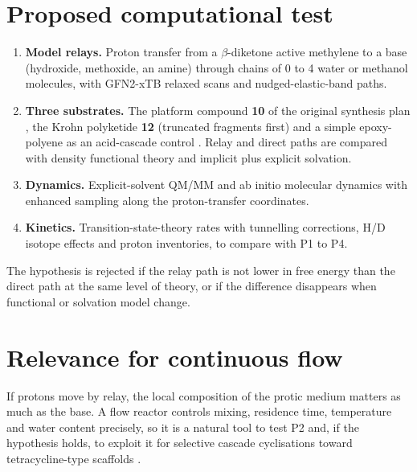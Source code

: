 \documentclass[11pt]{article}
\begin{document}
\section{Proposed computational test}\label{sec:valid}
\begin{enumerate}
\item \textbf{Model relays.} Proton transfer from a $\beta$-diketone active methylene to a base (hydroxide, methoxide, an amine) through chains of 0 to 4 water or methanol molecules, with GFN2-xTB \cite{bannwarth2019} relaxed scans and nudged-elastic-band paths.
\item \textbf{Three substrates.} The platform compound \textbf{10} of the original synthesis plan \cite{kleber2020}, the Krohn polyketide \textbf{12} \cite{krohn2000} (truncated fragments first) and a simple epoxy-polyene as an acid-cascade control \cite{corey1995,hess2017}. Relay and direct paths are compared with density functional theory and implicit plus explicit solvation.
\item \textbf{Dynamics.} Explicit-solvent QM/MM and ab initio molecular dynamics with enhanced sampling along the proton-transfer coordinates.
\item \textbf{Kinetics.} Transition-state-theory rates with tunnelling corrections, H/D isotope effects and proton inventories, to compare with P1 to P4.
\end{enumerate}
The hypothesis is rejected if the relay path is not lower in free energy than the direct path at the same level of theory, or if the difference disappears when functional or solvation model change.

\section{Relevance for continuous flow}
If protons move by relay, the local composition of the protic medium matters as much as the base. A flow reactor controls mixing, residence time, temperature and water content precisely, so it is a natural tool to test P2 and, if the hypothesis holds, to exploit it for selective cascade cyclisations toward tetracycline-type scaffolds \cite{kleber2020}.
\end{document}
